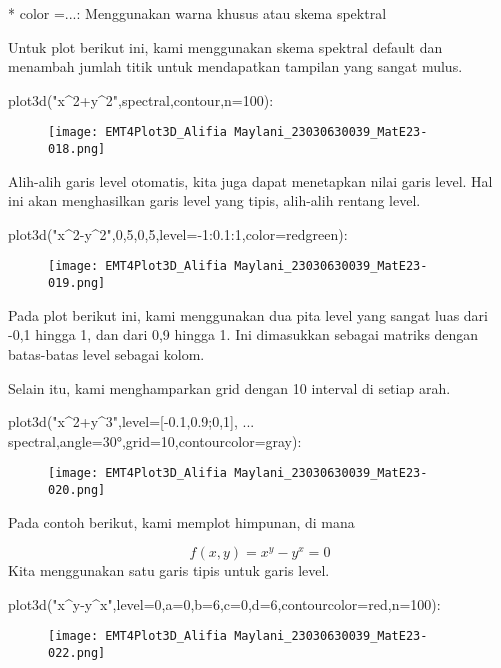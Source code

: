 \documentclass{article}
\begin{document}
* 
color =...: Menggunakan warna khusus atau skema spektral


Untuk plot berikut ini, kami menggunakan skema spektral default dan
menambah jumlah titik untuk mendapatkan tampilan yang sangat mulus.


\>plot3d("x^2+y^2",\>spectral,\>contour,n=100):


\begin{figure}
    \centering
    \texttt{[image: EMT4Plot3D\_Alifia Maylani\_23030630039\_MatE23-018.png]}
    \caption{}
    \label{fig:enter-label}
\end{figure}

Alih-alih garis level otomatis, kita juga dapat menetapkan nilai garis
level. Hal ini akan menghasilkan garis level yang tipis, alih-alih
rentang level.


\>plot3d("x^2-y^2",0,5,0,5,level=-1:0.1:1,color=redgreen):


\begin{figure}
    \centering
    \texttt{[image: EMT4Plot3D\_Alifia Maylani\_23030630039\_MatE23-019.png]}
    \caption{}
    \label{fig:enter-label}
\end{figure}

Pada plot berikut ini, kami menggunakan dua pita level yang sangat
luas dari -0,1 hingga 1, dan dari 0,9 hingga 1. Ini dimasukkan sebagai
matriks dengan batas-batas level sebagai kolom.


Selain itu, kami menghamparkan grid dengan 10 interval di setiap arah.


\>plot3d("x^2+y^3",level=[-0.1,0.9;0,1], ...  
\>     \>spectral,angle=30°,grid=10,contourcolor=gray):


\begin{figure}
    \centering
    \texttt{[image: EMT4Plot3D\_Alifia Maylani\_23030630039\_MatE23-020.png]}
    \caption{}
    \label{fig:enter-label}
\end{figure}

Pada contoh berikut, kami memplot himpunan, di mana


$$f(x,y) = x^y-y^x = 0$$Kita menggunakan satu garis tipis untuk garis level.


\>plot3d("x^y-y^x",level=0,a=0,b=6,c=0,d=6,contourcolor=red,n=100):


\begin{figure}
    \centering
    \texttt{[image: EMT4Plot3D\_Alifia Maylani\_23030630039\_MatE23-022.png]}
    \caption{}
    \label{fig:enter-label}
\end{figure}
\end{document}
